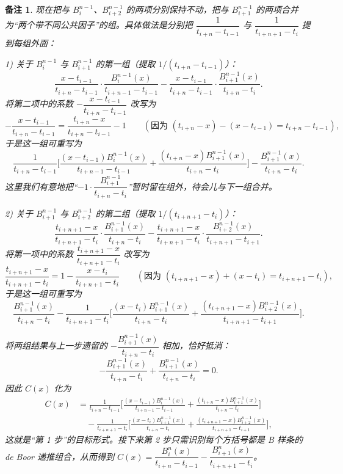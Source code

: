 \documentclass[a4paper]{ctexart}
\newtheorem*{remark*}{备注}
\numberwithin{theorem}{section}
\numberwithin{equation}{section}
\numberwithin{figure}{section}
\numberwithin{remark}{section}
\begin{document}
\begin{remark*}
现在把与 $B^{n-1}_i$、$B^{n-1}_{i+2}$ 的两项分别保持不动，把与
$B^{n-1}_{i+1}$ 的两项合并为“两个带不同公共因子”的组。具体做法是分别把
$\dfrac{1}{t_{i+n}-t_{i-1}}$ 与 $\dfrac{1}{t_{i+n+1}-t_i}$ 提到每组外面：

1) 关于 $B^{n-1}_i$ 与 $B^{n-1}_{i+1}$ 的第一组（提取 $1/(t_{i+n}-t_{i-1})$）：
\[
\frac{x-t_{i-1}}{t_{i+n}-t_{i-1}}\cdot
\frac{B^{n-1}_i(x)}{t_{i+n-1}-t_{i-1}}
-\frac{x-t_{i-1}}{t_{i+n}-t_{i-1}}\cdot
\frac{B^{n-1}_{i+1}(x)}{t_{i+n}-t_i}.
\]
将第二项中的系数
$-\dfrac{x-t_{i-1}}{t_{i+n}-t_{i-1}}$
改写为
\[
-\frac{x-t_{i-1}}{t_{i+n}-t_{i-1}}
=\frac{t_{i+n}-x}{t_{i+n}-t_{i-1}}-1
\qquad (\text{因为 }(t_{i+n}-x)-(x-t_{i-1})=t_{i+n}-t_{i-1}),
\]
于是这一组可重写为
\[
\frac{1}{t_{i+n}-t_{i-1}}
\Biggl[
\frac{(x-t_{i-1})B^{n-1}_i(x)}{t_{i+n-1}-t_{i-1}}
+\frac{(t_{i+n}-x)B^{n-1}_{i+1}(x)}{t_{i+n}-t_i}
\Biggr]
-\frac{B^{n-1}_{i+1}(x)}{t_{i+n}-t_i}.
\]
这里我们有意地把“$-1\cdot\dfrac{B^{n-1}_{i+1}}{t_{i+n}-t_i}$”暂时留在组外，待会儿与下一组合并。

2) 关于 $B^{n-1}_{i+1}$ 与 $B^{n-1}_{i+2}$ 的第二组（提取 $1/(t_{i+n+1}-t_i)$）：
\[
\frac{t_{i+n+1}-x}{t_{i+n+1}-t_i}\cdot
\frac{B^{n-1}_{i+1}(x)}{t_{i+n}-t_i}
-\frac{t_{i+n+1}-x}{t_{i+n+1}-t_i}\cdot
\frac{B^{n-1}_{i+2}(x)}{t_{i+n+1}-t_{i+1}}.
\]
将第一项中的系数
$\dfrac{t_{i+n+1}-x}{t_{i+n+1}-t_i}$
改写为
\[
\frac{t_{i+n+1}-x}{t_{i+n+1}-t_i}
=1-\frac{x-t_i}{t_{i+n+1}-t_i}
\qquad (\text{因为 }(t_{i+n+1}-x)+(x-t_i)=t_{i+n+1}-t_i),
\]
于是这一组可重写为
\[
\frac{B^{n-1}_{i+1}(x)}{t_{i+n}-t_i}
-\frac{1}{t_{i+n+1}-t_i}
\Biggl[
\frac{(x-t_i)B^{n-1}_{i+1}(x)}{t_{i+n}-t_i}
+\frac{(t_{i+n+1}-x)B^{n-1}_{i+2}(x)}{t_{i+n+1}-t_{i+1}}
\Biggr].
\]

将两组结果与上一步遗留的
$-\dfrac{B^{n-1}_{i+1}(x)}{t_{i+n}-t_i}$ 相加，恰好抵消：
\[
-\frac{B^{n-1}_{i+1}(x)}{t_{i+n}-t_i}
+\frac{B^{n-1}_{i+1}(x)}{t_{i+n}-t_i}=0.
\]
因此 $C(x)$ 化为
\[
\boxed{
\begin{aligned}
C(x)
&=\frac{1}{t_{i+n}-t_{i-1}}
\Biggl[
\frac{(x-t_{i-1})B^{n-1}_i(x)}{t_{i+n-1}-t_{i-1}}
+\frac{(t_{i+n}-x)B^{n-1}_{i+1}(x)}{t_{i+n}-t_i}
\Biggr]\\
&\quad-\frac{1}{t_{i+n+1}-t_i}
\Biggl[
\frac{(x-t_i)B^{n-1}_{i+1}(x)}{t_{i+n}-t_i}
+\frac{(t_{i+n+1}-x)B^{n-1}_{i+2}(x)}{t_{i+n+1}-t_{i+1}}
\Biggr],
\end{aligned}}
\]
这就是“第 1 步”的目标形式。接下来第 2 步只需识别每个方括号都是
B 样条的 de Boor 递推组合，从而得到
$C(x)=\dfrac{B^{n}_i(x)}{t_{i+n}-t_{i-1}}
-\dfrac{B^{n}_{i+1}(x)}{t_{i+n+1}-t_i}$。
\end{remark*}
\end{document}
